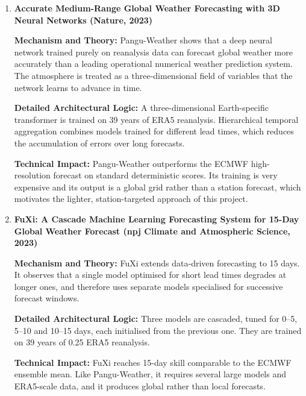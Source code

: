 \begin{enumerate}
\textbf{Detailed Architectural Logic:} TabStruct-Net V2 performs top-down cell detection and bottom-up structure association. A vision transformer with local attention models cell relationships, and a split-and-merge stage resolves cells that span several rows or columns.

\textbf{Technical Impact:} The method improves structure recognition on complex table layouts. It recognises structure only, without OCR, and high-resolution inputs make it computationally heavy, which limits its use for a small project without a GPU.

\item \textbf{Accurate Medium-Range Global Weather Forecasting with 3D Neural Networks (Nature, 2023)}

\textbf{Mechanism and Theory:} Pangu-Weather shows that a deep neural network trained purely on reanalysis data can forecast global weather more accurately than a leading operational numerical weather prediction system. The atmosphere is treated as a three-dimensional field of variables that the network learns to advance in time.

\textbf{Detailed Architectural Logic:} A three-dimensional Earth-specific transformer is trained on 39 years of ERA5 reanalysis. Hierarchical temporal aggregation combines models trained for different lead times, which reduces the accumulation of errors over long forecasts.

\textbf{Technical Impact:} Pangu-Weather outperforms the ECMWF high-resolution forecast on standard deterministic scores. Its training is very expensive and its output is a global grid rather than a station forecast, which motivates the lighter, station-targeted approach of this project.

\newpage
\item \textbf{FuXi: A Cascade Machine Learning Forecasting System for 15-Day Global Weather Forecast (npj Climate and Atmospheric Science, 2023)}

\textbf{Mechanism and Theory:} FuXi extends data-driven forecasting to 15 days. It observes that a single model optimised for short lead times degrades at longer ones, and therefore uses separate models specialised for successive forecast windows.

\textbf{Detailed Architectural Logic:} Three models are cascaded, tuned for 0--5, 5--10 and 10--15 days, each initialised from the previous one. They are trained on 39 years of 0.25\textdegree{} ERA5 reanalysis.

\textbf{Technical Impact:} FuXi reaches 15-day skill comparable to the ECMWF ensemble mean. Like Pangu-Weather, it requires several large models and ERA5-scale data, and it produces global rather than local forecasts.


\end{enumerate}
